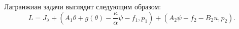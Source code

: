 Лагранжиан задачи выглядит следующим образом:
\begin{equation}
    \label{lagrange}
    L = J_\lambda + (A_1 \theta+ g(\theta) - \frac{\kappa}{\alpha}\psi -f_1, p_1)
    + (A_2 \psi - f_2 - B_2 u, p_2).
\end{equation}
